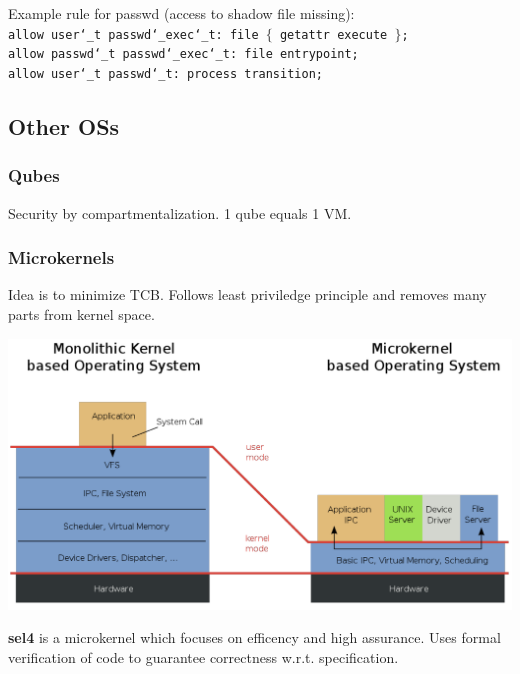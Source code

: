 Example rule for passwd (access to shadow file missing):\\
\texttt{allow user\char`_t passwd\char`_exec\char`_t: file $\{$ getattr execute $\}$; \\ allow passwd\char`_t passwd\char`_exec\char`_t: file entrypoint; \\ allow user\char`_t passwd\char`_t: process transition;}

\subsection{Other OSs}
\subsubsection{Qubes}
Security by compartmentalization. 1 qube equals 1 VM.

\subsubsection{Microkernels}
Idea is to minimize TCB. Follows least priviledge principle and removes many parts from kernel space.
\begin{center}
    \includegraphics[width=0.8\linewidth]{images/os_sec_MicrokernelVSMonolithic.png}
\end{center}

\textbf{sel4} is a microkernel which focuses on efficency and high assurance. Uses formal verification of code to guarantee correctness w.r.t. specification.
